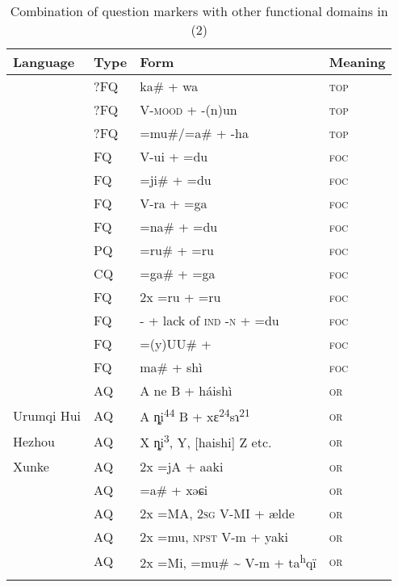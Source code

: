 \begin{table}
\caption{Combination of question markers with other functional domains in  (2)}
\label{tab:6:3}

\begin{tabularx}{\textwidth}{llQl}
\lsptoprule

\textbf{Language} & \textbf{Type} & \textbf{Form} & \textbf{Meaning}\\
\midrule
{} & ?FQ & ka\# + wa & \textsc{top}\\
 & ?FQ & \textsc{V-mood} + -(n)un & \textsc{top}\\
 & ?FQ & =mu\#/=a\# + -ha & \textsc{top}\\
 & FQ & V-ui + =du & \textsc{foc}\\
 & FQ & =ji\# + =du & \textsc{foc}\\
& FQ & V-ra + =ga & \textsc{foc}\\
 & FQ & =na\# + =du & \textsc{foc}\\
 & PQ & =ru\# + =ru & \textsc{foc}\\
& CQ & =ga\# + =ga & \textsc{foc}\\
& FQ & 2x =ru + =ru & \textsc{foc}\\
 & FQ & {}- + lack of \textsc{ind} -\textsc{n} + =du & \textsc{foc}\\
 & FQ & =(y)UU\# +  & \textsc{foc}\\
 & FQ & ma\# + shì & \textsc{foc}\\
& AQ & A ne B + háishì & \textsc{or}\\
Urumqi Hui  & AQ & A ȵi\textsuperscript{44} B + xɛ\textsuperscript{24}sɿ\textsuperscript{21} & \textsc{or}\\
Hezhou  & AQ & X ȵi\textsuperscript{3}, Y, [haishi] Z etc. & \textsc{or}\\
Xunke  & AQ & 2x =jA + aaki & \textsc{or}\\
 & AQ & =a\# + xəɕi & \textsc{or}\\
 & AQ & 2x =MA, 2\textsc{sg} V-MI + ælde & \textsc{or}\\
 & AQ & 2x =mu, \textsc{npst} V-m + yaki & \textsc{or}\\
 & AQ & 2x =Mi, =mu\# {\textasciitilde} V-m + ta\textsuperscript{h}qï & \textsc{or}\\
\lspbottomrule
\end{tabularx}
\end{table}


